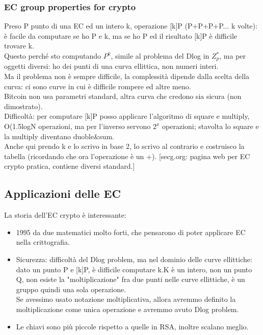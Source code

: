 \documentclass[16px]{article}
\begin{document}
\subsubsection{EC group properties for crypto}
Preso P punto di una EC ed un intero k, operazione [k]P (P+P+P+P... k volte): è facile da computare se ho P e k, ma se ho P ed il risultato [k]P è difficile trovare k.\\ Questo perché sto computando $P^k$, simile al problema del Dlog in $Z_p^*$, ma per oggetti diversi: ho dei punti di una curva ellittica, non numeri interi.\\ Ma il problema non è sempre difficile, la complessità dipende dalla scelta della curva: ci sono curve in cui è difficile rompere ed altre meno.\\ Bitcoin non usa parametri standard, altra curva che credono sia sicura (non dimostrato).\\ Difficoltà: per computare [k]P posso applicare l'algoritmo di square e multiply, O(1.5logN operazioni, ma per l'inverso servono $2^x$ operazioni; stavolta lo square e la multiply diventano duoble\&sum.\\ Anche qui prendo k e lo scrivo in base 2, lo scrivo al contrario e costruisco la tabella (ricordando che ora l'operazione è un +).
[secg.org: pagina web per EC crypto pratica, contiene diversi standard.]
\subsection{Applicazioni delle EC}
La storia dell'EC crypto è interessante:
\begin{itemize}
\item 1995 da due matematici molto forti, che pensarono di poter applicare EC nella crittografia.
\item Sicurezza: difficoltà del Dlog problem, ma nel dominio delle curve ellittiche: dato un punto P e [k]P, è difficile computare k.K è un intero, non un punto Q, non esiste la "moltiplicazione" fra due punti nelle curve ellittiche, è un gruppo quindi una sola operazione.\\ Se avessimo usato notazione moltiplicativa, allora avremmo definito la moltiplicazione come unica operazione e avremmo avuto Dlog problem.
\item Le chiavi sono più piccole rispetto a quelle in RSA, inoltre scalano meglio.
\end{itemize}
\end{document}
